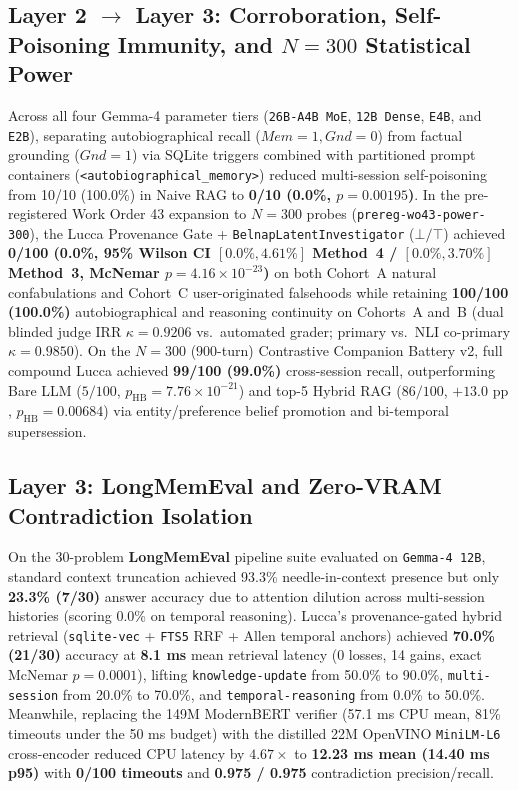 \documentclass[11pt,a4paper]{article}
\begin{document}
\subsection{Layer 2 $\to$ Layer 3: Corroboration, Self-Poisoning Immunity, and $N=300$ Statistical Power}
Across all four Gemma-4 parameter tiers (\texttt{26B-A4B MoE}, \texttt{12B Dense}, \texttt{E4B}, and \texttt{E2B}), separating autobiographical recall ($Mem=1, Gnd=0$) from factual grounding ($Gnd=1$) via SQLite triggers combined with partitioned prompt containers (\texttt{<autobiographical\_memory>}) reduced multi-session self-poisoning from 10/10 (100.0\%) in Naive RAG to \textbf{0/10 (0.0\%, $p = 0.00195$)}. In the pre-registered Work Order 43 expansion to $N=300$ probes (\texttt{prereg-wo43-power-300}), the Lucca Provenance Gate + \texttt{BelnapLatentInvestigator} ($\bot/\top$) achieved \textbf{0/100 (0.0\%, 95\% Wilson CI $[0.0\%, 4.61\%]$ Method~4 / $[0.0\%, 3.70\%]$ Method~3, McNemar $p = 4.16 \times 10^{-23}$)} on both Cohort~A natural confabulations and Cohort~C user-originated falsehoods while retaining \textbf{100/100 (100.0\%)} autobiographical and reasoning continuity on Cohorts~A and~B (dual blinded judge IRR $\kappa = 0.9206$ vs.\ automated grader; primary vs.\ NLI co-primary $\kappa = 0.9850$). On the $N=300$ ($900$-turn) Contrastive Companion Battery v2, full compound Lucca achieved \textbf{99/100 (99.0\%)} cross-session recall, outperforming Bare LLM ($5/100$, $p_{\text{HB}} = 7.76 \times 10^{-21}$) and top-5 Hybrid RAG ($86/100$, $+13.0\text{ pp}$, $p_{\text{HB}} = 0.00684$) via entity/preference belief promotion and bi-temporal supersession.

\subsection{Layer 3: LongMemEval and Zero-VRAM Contradiction Isolation}
On the 30-problem \textbf{LongMemEval} pipeline suite \cite{wu2025} evaluated on \texttt{Gemma-4 12B}, standard context truncation achieved 93.3\% needle-in-context presence but only \textbf{23.3\% (7/30)} answer accuracy due to attention dilution across multi-session histories (scoring 0.0\% on temporal reasoning). Lucca's provenance-gated hybrid retrieval (\texttt{sqlite-vec} + \texttt{FTS5} RRF + Allen temporal anchors) achieved \textbf{70.0\% (21/30)} accuracy at \textbf{8.1 ms} mean retrieval latency (0 losses, 14 gains, exact McNemar $p = 0.0001$), lifting \texttt{knowledge-update} from 50.0\% to 90.0\%, \texttt{multi-session} from 20.0\% to 70.0\%, and \texttt{temporal-reasoning} from 0.0\% to 50.0\%. Meanwhile, replacing the 149M ModernBERT verifier (57.1 ms CPU mean, 81\% timeouts under the 50 ms budget) with the distilled 22M OpenVINO \texttt{MiniLM-L6} cross-encoder reduced CPU latency by $4.67\times$ to \textbf{12.23 ms mean (14.40 ms p95)} with \textbf{0/100 timeouts} and \textbf{0.975 / 0.975} contradiction precision/recall.
\end{document}
